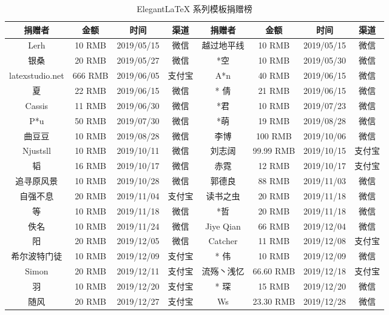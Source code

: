 \documentclass[cn,hazy,blue,14pt,screen]{elegantnote}
\begin{document}
\begin{table}[htbp]
  \scriptsize
  \centering
  \caption{Elegant\LaTeX{} 系列模板捐赠榜}
    \begin{tabular}{*{8}{>{\scriptsize}c}}
    \toprule
    \textbf{捐赠者} & \textbf{金额} & \textbf{时间} & \textbf{渠道} & \textbf{捐赠者} & \textbf{金额} & \textbf{时间} & \textbf{渠道} \\
    \midrule
    Lerh  & 10 RMB & 2019/05/15 & 微信    & 越过地平线 & 10 RMB & 2019/05/15 & 微信 \\
    银桑    & 20 RMB & 2019/05/27 & 微信    & *空    & 10 RMB & 2019/05/30 & 微信 \\
    latexstudio.net & 666 RMB & 2019/06/05 & 支付宝   & A*n   & 40 RMB & 2019/06/15 & 微信 \\
    * 夏   & 22 RMB & 2019/06/15 & 微信    & * 倩   & 21 RMB  & 2019/06/15 & 微信 \\
    Cassis & 11 RMB & 2019/06/30 & 微信    & *君    & 10 RMB & 2019/07/23 & 微信 \\
    P*u   & 50 RMB & 2019/07/30 & 微信    & *萌    & 19 RMB & 2019/08/28 & 微信 \\
    曲豆豆   & 10 RMB & 2019/08/28 & 微信    & 李博    & 100 RMB & 2019/10/06 & 微信 \\
    Njustsll & 10 RMB & 2019/10/11 & 微信    & 刘志阔   & 99.99 RMB & 2019/10/15 & 支付宝 \\
    * 韬   & 16 RMB & 2019/10/17 & 微信    & 赤霓    & 12 RMB & 2019/10/17 & 支付宝 \\
    追寻原风景 & 10 RMB & 2019/10/28 & 微信    & 郭德良   & 88 RMB & 2019/11/03 & 微信 \\
    自强不息  & 20 RMB & 2019/11/04 & 支付宝   & 读书之虫  & 20 RMB & 2019/11/18 & 微信 \\
    *等    & 10 RMB & 2019/11/18 & 微信    & *哲    & 20 RMB & 2019/11/18 & 微信 \\
    佚名    & 10 RMB & 2019/11/24 & 微信    & Jiye Qian & 66 RMB & 2019/12/04 & 微信 \\
    * 阳   & 20 RMB & 2019/12/05 & 微信    & Catcher & 11 RMB & 2019/12/08 & 支付宝 \\
    希尔波特门徒 & 10 RMB & 2019/12/09 & 支付宝   & * 伟   & 10 RMB & 2019/12/09 & 微信 \\
    Simon & 20 RMB & 2019/12/11 & 支付宝   & 流殇丶浅忆 & 66.60 RMB & 2019/12/18 & 支付宝 \\
    羽     & 10 RMB & 2019/12/20 & 支付宝   & * 琛   & 15 RMB & 2019/12/20 & 微信 \\
    随风    & 20 RMB & 2019/12/27 & 支付宝   & Ws    & 23.30 RMB & 2019/12/28 & 微信 \\

\end{tabular}
\end{table}
\end{document}

